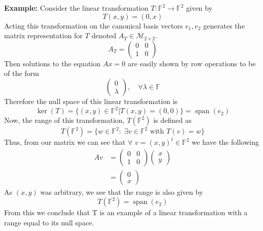 \documentclass[a4paper, 11pt]{article}
\newcommand{\F}{\mathbb{F}}
\newenvironment{solution}{%
	\begin{list}{}{%
			\setlength{\topsep}{0pt}%
			\setlength{\leftmargin}{1.5cm}%
			\setlength{\rightmargin}{1.5cm}%
			\setlength{\listparindent}{\parindent}%
			\setlength{\itemindent}{\parindent}%
			\setlength{\parsep}{\parskip}%
		}%
		\item[]}{\end{list}}
\begin{document}
	\begin{solution}
		\noindent\textbf{Example:} Consider the linear transformation $T:\F^2\to\F^2$ given by
			\begin{equation*}
				T(x,y) = (0, x) 
			\end{equation*}
		Acting this transformation on the canonical basis vectors $e_1, e_2$ generates the matrix representation for $T$ denoted $A_T \in \mathcal{M}_{2\times2}$. 
			\begin{equation*}
				A_T = \begin{pmatrix}
					0 & 0 \\ 
					1 & 0 
				\end{pmatrix}
			\end{equation*}
		Then solutions to the equation $Ax=0$ are easily shown by row operations to be of the form
			\begin{equation*}
				\begin{pmatrix} 0 \\ \lambda \end{pmatrix}, \quad \forall \lambda\in\F
			\end{equation*}
		Therefore the null space of this linear transformation is
			\begin{equation*}
				\ker(T) = \{(x,y)\in \F^2| T(x,y) = (0,0)\} = \operatorname{span}(e_2)
			\end{equation*}
		Now, the range of this transformation, $T(\F^2)$ is defined as 
			\begin{equation*} 
				T(\F^2) = \{w\in \F^2 :\; \exists v \in \F^2 \text{ with } T(v)=w\}
			\end{equation*}
		Thus, from our matrix we can see that $\forall$ $v=(x,y)^t \in \F^2$ we have the following
			\begin{align*}
				Av &= \begin{pmatrix}0 & 0 \\ 1 & 0\end{pmatrix}\begin{pmatrix}x \\ y\end{pmatrix}\\ 
				&= \begin{pmatrix}0 \\ x\end{pmatrix}
			\end{align*}
		As $(x,y)$ was arbitrary, we see that the range is also given by 
			\begin{equation*} 
				T(\F^2) = \operatorname{span}(e_2)
			\end{equation*}
		From this we conclude that T is an example of a linear transformation with a range equal to its null space. 
	\end{solution}
\end{document}
